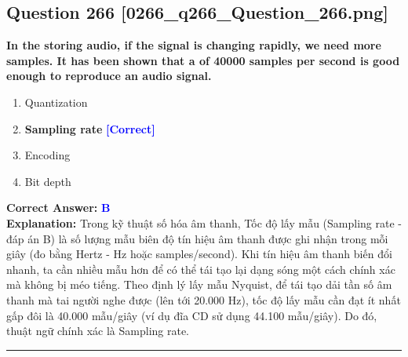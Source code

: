 \documentclass[11pt,a4paper]{article}
\begin{document}
\begin{minipage}{\textwidth}
\subsection*{Question 266 \quad \footnotesize{[0266\_q266\_Question\_266.png]}}
\noindent \textbf{In the storing audio, if the signal is changing rapidly, we need more samples. It has been shown that a of 40000 samples per second is good enough to reproduce an audio signal.}

\begin{enumerate}[label=\Alph*.]
    \item Quantization
    \item \textbf{Sampling rate} \hfill \textcolor{blue}{\textbf{[Correct]}}
    \item Encoding
    \item Bit depth
\end{enumerate}

\noindent \textbf{Correct Answer:} \textcolor{blue}{\textbf{B}} \\[2pt]
\noindent \textbf{Explanation:} Trong kỹ thuật số hóa âm thanh, Tốc độ lấy mẫu (Sampling rate - đáp án B) là số lượng mẫu biên độ tín hiệu âm thanh được ghi nhận trong mỗi giây (đo bằng Hertz - Hz hoặc samples/second). Khi tín hiệu âm thanh biến đổi nhanh, ta cần nhiều mẫu hơn để có thể tái tạo lại dạng sóng một cách chính xác mà không bị méo tiếng. Theo định lý lấy mẫu Nyquist, để tái tạo dải tần số âm thanh mà tai người nghe được (lên tới 20.000 Hz), tốc độ lấy mẫu cần đạt ít nhất gấp đôi là 40.000 mẫu/giây (ví dụ đĩa CD sử dụng 44.100 mẫu/giây). Do đó, thuật ngữ chính xác là Sampling rate.

\par\vspace{0.3cm}
\hrule
\vspace{0.3cm}
\end{minipage}
\end{document}
